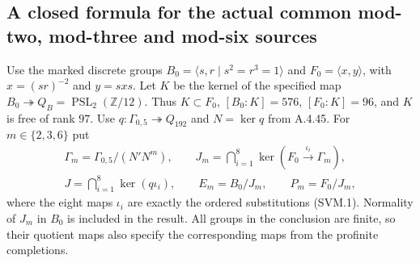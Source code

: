 \subsection{A closed formula for the actual common mod-two, mod-three and mod-six sources}

Use the marked discrete groups
$B_0=\langle s,r\mid s^2=r^3=1\rangle$ and
$F_0=\langle x,y\rangle$, with $x=(sr)^{-2}$ and $y=sxs$.
Let $K$ be the kernel of the specified map
$B_0\twoheadrightarrow Q_B=\operatorname{PSL}_2(\mathbb Z/12)$.
Thus $K\subset F_0$, $[B_0:K]=576$, $[F_0:K]=96$, and $K$
is free of rank $97$.  Use $q:\Gamma_{0,5}\twoheadrightarrow Q_{192}$
and $N=\ker q$ from A.4.45.  For $m\in\{2,3,6\}$ put
\[
 \begin{gathered}
 \Gamma_m=\Gamma_{0,5}/(N'N^m),\qquad
 J_m=\bigcap_{i=1}^8
       \ker(F_0\xrightarrow{\iota_i}\Gamma_m),\\
 J=\bigcap_{i=1}^8\ker(q\iota_i),\qquad
 E_m=B_0/J_m,\qquad P_m=F_0/J_m,
 \end{gathered}                                                 \tag{CFK.1}
\]
where the eight maps $\iota_i$ are exactly the ordered substitutions
(SVM.1).  Normality of $J_m$ in $B_0$ is included in the result.
All groups in the conclusion are finite, so their quotient maps also
specify the corresponding maps from the profinite completions.

